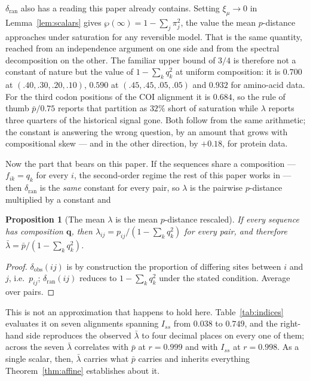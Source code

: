 \documentclass[11pt]{article}
\newcommand{\Iss}{I_{ss}}
\newtheorem{proposition}[theorem]{Proposition}
\theoremstyle{definition}
\theoremstyle{remark}
\begin{document}
$\delta_{\mathrm{ran}}$ also has a reading this paper already contains.
Setting $\xi_\mu\to0$ in Lemma~\ref{lem:scalars} gives
$\wp(\infty)=1-\sum_j\pi_j^2$, the value the mean $p$-distance approaches
under saturation for any reversible model. That is the same quantity, reached
from an independence argument on one side and from the spectral decomposition
on the other. The familiar upper bound of $3/4$ is therefore not a constant
of nature but the value of $1-\sum_kq_k^2$ at uniform composition: it is
$0.700$ at $(.40,.30,.20,.10)$, $0.590$ at $(.45,.45,.05,.05)$ and $0.932$
for amino-acid data. For the third codon positions of the COI alignment it is
$0.684$, so the rule of thumb $\bar p/0.75$ reports that partition as $32\%$
short of saturation while $\lambda$ reports three quarters of the historical
signal gone. Both follow from the same arithmetic; the constant is answering
the wrong question, by an amount that grows with compositional skew --- and in
the other direction, by $+0.18$, for protein data.

Now the part that bears on this paper. If the sequences share a composition
--- $f_{ik}=q_k$ for every $i$, the second-order regime the rest of this
paper works in --- then $\delta_{\mathrm{ran}}$ is the \emph{same} constant
for every pair, so $\lambda$ is the pairwise $p$-distance multiplied by a
constant and

\begin{proposition}[The mean $\lambda$ is the mean $p$-distance rescaled]
\label{prop:lambda}
If every sequence has composition $\mathbf q$, then
$\lambda_{ij}=p_{ij}/(1-\sum_k q_k^2)$ for every pair, and therefore
$\bar\lambda=\bar p/(1-\sum_k q_k^2)$.
\end{proposition}

\begin{proof}
$\delta_{\mathrm{obs}}(ij)$ is by construction the proportion of differing
sites between $i$ and $j$, i.e.\ $p_{ij}$; $\delta_{\mathrm{ran}}(ij)$ reduces
to $1-\sum_kq_k^2$ under the stated condition. Average over pairs.
\end{proof}

This is not an approximation that happens to hold here.
Table~\ref{tab:indices} evaluates it on seven alignments spanning $\Iss$ from
$0.038$ to $0.749$, and the right-hand side reproduces the observed
$\bar\lambda$ to four decimal places on every one of them; across the seven
$\bar\lambda$ correlates with $\bar p$ at $r=0.999$ and with $\Iss$ at
$r=0.998$. As a single scalar, then, $\bar\lambda$ carries what $\bar p$
carries and inherits everything Theorem~\ref{thm:affine} establishes about it.
\end{document}

